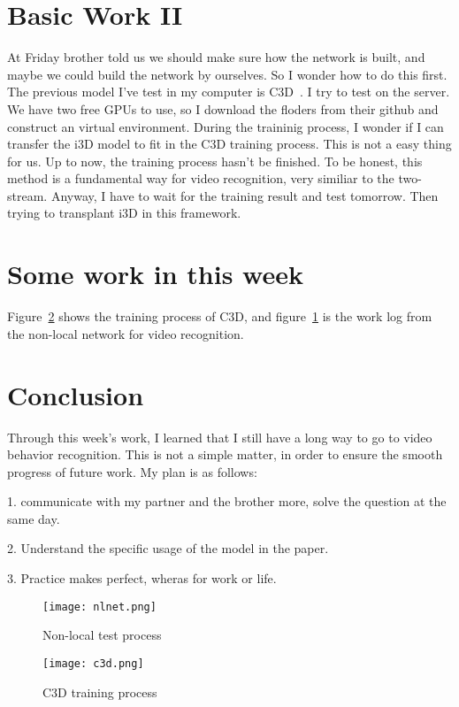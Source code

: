 \documentclass[10pt,letterpaper]{article}
\begin{document}
\section{Basic Work II}
At Friday brother told us we should make sure how the network is built, and maybe we could build the network by ourselves. So I wonder how to do this first. The previous model I've test in my computer is C3D~\cite{name3}. I try to test on the server. We have two free GPUs to use, so I download the floders from their github and construct an virtual environment. During the traininig process, I wonder if I can transfer the i3D model to fit in the C3D training process. This is not a easy thing for us. Up to now, the training process hasn't be finished. To be honest, this method is a fundamental way for video recognition, very similiar to the two-stream. Anyway, I have to wait for the training result and test tomorrow. Then trying to transplant i3D in this framework. 
\section{Some work in this week}
Figure~\ref{fv} shows the training process of C3D, and figure~\ref{fx} is the work log from the non-local network for video recognition.
\section{Conclusion}
Through this week's work, I learned that I still have a long way to go to video behavior recognition. This is not a simple matter, in order to ensure the smooth progress of future work. My plan is as follows:
\par 1. communicate with my partner and the brother more, solve the question at the same day.
\par 2. Understand the specific usage of the model in the paper.
\par 3. Practice makes perfect, wheras for work or life.
 \begin{figure}[!htb]
 	\centering
 	\texttt{[image: nlnet.png]}\\
 	\caption{Non-local test process}\label{fx}
 \end{figure}
  \begin{figure}[!htb]
  	\centering
  	\texttt{[image: c3d.png]}\\
  	\caption{C3D training process}\label{fv}
  \end{figure}



\end{document}
